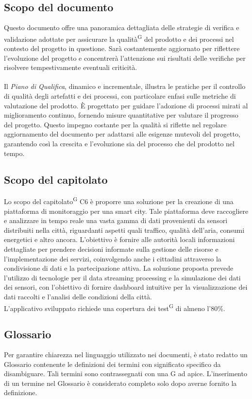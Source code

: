 \documentclass[8pt]{article}
\newcommand{\glossterm}[1]{#1\textsuperscript{G}} %
\begin{document}
\subsection{Scopo del documento}
Questo documento offre una panoramica dettagliata delle strategie di verifica e validazione adottate per assicurare la \glossterm{qualità} del prodotto e dei processi nel contesto del progetto in questione. Sarà costantemente aggiornato per riflettere l'evoluzione del progetto e concentrerà l'attenzione sui risultati delle verifiche per risolvere tempestivamente eventuali criticità.
\\\\
Il \textit{Piano di Qualifica}, dinamico e incrementale, illustra le pratiche per il controllo di qualità degli artefatti e dei processi, con particolare enfasi sulle metriche di valutazione del prodotto. È progettato per guidare l'adozione di processi mirati al miglioramento continuo, fornendo misure quantitative per valutare il progresso del progetto. Questo impegno costante per la qualità si riflette nel regolare aggiornamento del documento per adattarsi alle esigenze mutevoli del progetto, garantendo così la crescita e l'evoluzione sia del processo che del prodotto nel tempo.
\subsection{Scopo del capitolato}
Lo scopo del \glossterm{capitolato} C6 è proporre una soluzione per la creazione di una piattaforma di monitoraggio per una smart city. Tale piattaforma deve raccogliere e analizzare in tempo reale una vasta gamma di dati provenienti da sensori distribuiti nella città, riguardanti aspetti quali traffico, qualità dell'aria, consumi energetici e altro ancora. L'obiettivo è fornire alle autorità locali informazioni dettagliate per prendere decisioni informate sulla gestione delle risorse e l'implementazione dei servizi, coinvolgendo anche i cittadini attraverso la condivisione di dati e la partecipazione attiva. La soluzione proposta prevede l'utilizzo di tecnologie per il data streaming processing e la simulazione dei dati dei sensori, con l'obiettivo di fornire dashboard intuitive per la visualizzazione dei dati raccolti e l'analisi delle condizioni della città.\\
L’applicativo sviluppato richiede una copertura dei \glossterm{test} di almeno l’80\%.

\subsection{Glossario}
Per garantire chiarezza nel linguaggio utilizzato nei documenti, è stato redatto un Glossario contenente le definizioni dei termini con significato specifico da disambiguare. Tali termini sono contrassegnati con una G ad apice. L'inserimento di un termine nel Glossario è considerato completo solo dopo averne fornito la definizione.
\end{document}
